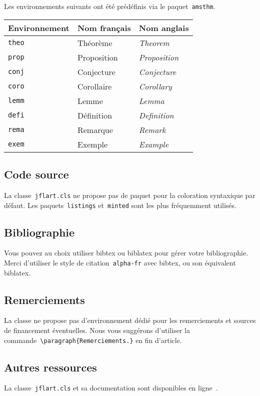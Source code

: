 \documentclass[draft]{jflart}
\newcommand{\cmd}[1]{\texttt{\textbackslash {#1}}}
\begin{document}
Les environnements suivants ont été prédéfinis via le paquet~\texttt{amsthm}.

\begin{center}
  \begin{tabular}{lll}
    Environnement & Nom français & Nom anglais
    \\
    \hline
    \texttt{theo} & Théorème & \emph{Theorem}
    \\
    \texttt{prop} & Proposition & \emph{Proposition}
    \\
    \texttt{conj} & Conjecture & \emph{Conjecture}
    \\
    \texttt{coro} & Corollaire & \emph{Corollary}
    \\
    \texttt{lemm} & Lemme & \emph{Lemma}
    \\
    \texttt{defi} & Définition & \emph{Definition}
    \\
    \texttt{rema} & Remarque & \emph{Remark}
    \\
    \texttt{exem} & Exemple & \emph{Example}
  \end{tabular}
\end{center}

\subsection{Code source}

La classe~\texttt{jflart.cls} ne propose pas de paquet pour la coloration
syntaxique par défaut.
%
Les paquets~\texttt{listings} et~\texttt{minted} sont les plus fréquemment
utilisés.

\subsection{Bibliographie}

Vous pouvez au choix utiliser bibtex ou biblatex pour gérer votre bibliographie.
%
Merci d'utiliser le style de citation~\texttt{alpha-fr} avec bibtex, ou son
équivalent biblatex.

\subsection{Remerciements}

La classe ne propose pas d'environnement dédié pour les remerciements et sources de financement éventuelles.
%
Nous vous suggérons d'utiliser la commande~\cmd{paragraph\{Remerciements.\}} en
fin d'article.

\subsection{Autres ressources}

La classe~\texttt{jflart.cls} et sa documentation sont disponibles en
ligne~\cite{JFLART}.



\end{document}

